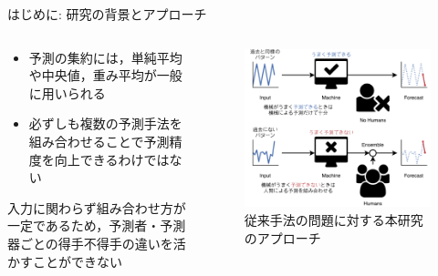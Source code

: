 \documentclass[dvipdfmx]{beamer}
\begin{document}
\begin{frame}{}
\begin{block}{はじめに: 研究の背景とアプローチ}
\begin{columns}
\begin{column}{.59\textwidth}
        \bigskip

        \begin{itemize}
          \item 予測の集約には，単純平均や中央値，重み平均が一般に用いられる
          \item 必ずしも複数の予測手法を組み合わせることで予測精度を向上できるわけではない
        \end{itemize}
        \smallskip
        \begin{itembox}[l]{}
          \alert{入力に関わらず組み合わせ方が一定であるため，予測者・予測器ごとの得手不得手の違いを活かすことができない}
        \end{itembox}
      \end{column}
      \begin{column}{.39\textwidth}
        \begin{figure}
          \centering
          \includegraphics[width=\textwidth]{slide-schematic.pdf}
          \caption{従来手法の問題に対する本研究のアプローチ}
        \end{figure}
      \end{column}
    \end{columns}
  \end{block}


\end{frame}
\end{document}

